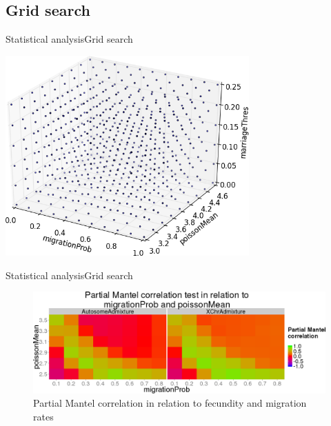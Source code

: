 \documentclass[10pt,aspectratio=43]{beamer}
\begin{document}
\subsection{Grid search}
\begin{frame}{Statistical analysis}{Grid search}
\begin{center}
  \includegraphics[width=0.7\textwidth]{../data/grid.png}
\end{center}
\end{frame}

\begin{frame}{Statistical analysis}{Grid search}
\begin{center}
  \begin{figure}
    \includegraphics[width=1\textwidth]{../data/sensit-comp-2d-preview.png}
    \caption{Partial Mantel correlation in relation to fecundity and migration rates}
  \end{figure}
\end{center}
\end{frame}
\end{document}
